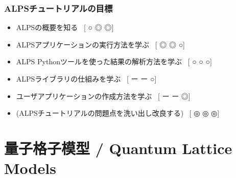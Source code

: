 \begin{frame}[t,fragile]
  \frametitle{ALPSチュートリアルの目標}
  \begin{itemize}
    \setlength{\itemsep}{1em}
    \item ALPSの概要を知る \ [{\footnotesize\color{red} ○}{\footnotesize\color{blue} ◎}{\footnotesize\color{green} ◎}]
    \item ALPSアプリケーションの実行方法を学ぶ  \ [{\footnotesize\color{red} ◎}{\footnotesize\color{blue} ◎}{\footnotesize\color{green} ○}]
    \item ALPS Pythonツールを使った結果の解析方法を学ぶ  \ [{\footnotesize\color{red} ○}{\footnotesize\color{blue} ○}{\footnotesize\color{green} ○}]
    \item ALPSライブラリの仕組みを学ぶ \ [{\footnotesize\color{red} ー}{\footnotesize\color{blue} ー}{\footnotesize\color{green} ○}]
    \item ユーザアプリケーションの作成方法を学ぶ \ [{\footnotesize\color{red} ー}{\footnotesize\color{blue} ー}{\footnotesize\color{green} ◎}]
    \item (ALPSチュートリアルの問題点を洗い出し改良する) \ [{\footnotesize\color{red} ◎}{\footnotesize\color{blue} ◎}{\footnotesize\color{green} ◎}] 
  \end{itemize}
\end{frame}

\section{量子格子模型 / Quantum Lattice Models}
\subsection*{\redb\whiteb\greenb}

